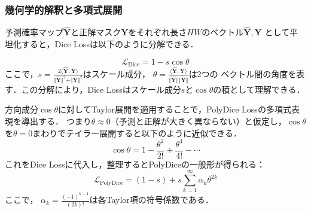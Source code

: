\documentclass[10pt, a4paper, twocolumn]{jarticle}
\begin{document}
\subsubsection{幾何学的解釈と多項式展開}

予測確率マップ$\hat{\mathbf{Y}}$と正解マスク$\mathbf{Y}$をそれぞれ長さ$HW$のベクトル$\hat{\mathbf{Y}}, \mathbf{Y}$
として平坦化すると，Dice Lossは以下のように分解できる．

\begin{equation}
  \mathcal{L}_{\text{Dice}} = 1 - s \cos  \theta
\end{equation}
ここで，$s = \frac{2 \langle \hat{\mathbf{Y}}, {\mathbf{Y}} \rangle}{\Vert \hat{\mathbf{Y}} \Vert ^ 2 + \Vert {\mathbf{Y}} \Vert ^ 2}$はスケール成分，
$\theta = \frac{\langle \hat{\mathbf{Y}}, {\mathbf{Y}}\rangle}{\Vert \hat{\mathbf{Y}} \Vert \Vert {\mathbf{Y}}\Vert}$は2つの
ベクトル間の角度を表す．この分解により，Dice Lossはスケール成分$s$と$\cos \theta$の積として理解できる．

方向成分$\cos \theta$に対してTaylor展開を適用することで，PolyDice Lossの多項式表現を導出する．
つまり$\theta \approx 0$（予測と正解が大きく異ならない）と仮定し，$\cos{\theta}$を$\theta = 0$まわりでテイラー展開すると以下のように近似できる．
\begin{equation}
  \cos{\theta} = 1 - \frac{\theta ^ 2}{2!} + \frac{\theta ^ 4}{4!} - \cdots
\end{equation}
これをDice Lossに代入し，整理するとPolyDiceの一般形が得られる：
\begin{equation}
  \mathcal{L}_{\text{PolyDice}} = (1 - s) + s \sum_{k = 1}^{\infty} \alpha_k \theta ^ {2k}
\end{equation}
ここで， $\alpha_k=\frac{(-1)^{k-1}}{(2k)!}$は各Taylor項の符号係数である．
\end{document}
